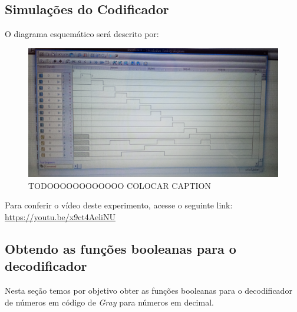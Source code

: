 \documentclass[12pt]{article}
\begin{document}
\subsection{Simulações do Codificador}\label{sec:2.2}

O diagrama esquemático será descrito por:

\begin{figure}[H]
    \centering
    \includegraphics[width=12cm]{Exp05/2.2.png}
    \caption{TODOOOOOOOOOOOO COLOCAR CAPTION}
    \label{fig:2.2.png}
\end{figure}

Para conferir o vídeo deste experimento, acesse o seguinte link:
\href{https://youtu.be/x9ct4AeliNU}{https://youtu.be/x9ct4AeliNU}

\subsection{Obtendo as funções booleanas para o decodificador}\label{sec:2.3}

Nesta seção temos por objetivo obter as funções booleanas para o decodificador
de números em código de \emph{Gray} para números em decimal.
\end{document}
